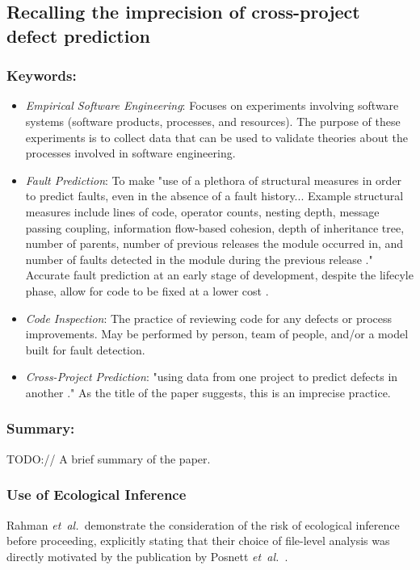 \documentclass{sig-alternate-05-2015}
\newcommand{\etal}{\mbox{\emph{et al.\ }}}
\begin{document}
\subsection{Recalling the imprecision of cross-project defect prediction \cite{Rahman:2012}}

\subsubsection{Keywords:}
\begin{itemize}
\item \emph{Empirical Software Engineering}: Focuses on experiments involving software systems (software products, processes, and resources). The purpose of these experiments is to collect data that can be used to validate theories about the processes involved in software engineering.
\item \emph{Fault Prediction}: To make "use of a plethora of structural measures in order to predict faults, even in the absence of a fault history... Example structural measures include lines of code, operator counts, nesting depth, message passing coupling, information flow-based cohesion, depth of inheritance tree, number of parents, number of previous releases the module occurred in, and number of faults detected in the module during the previous release \cite{Binkley:2007}." Accurate fault prediction at an early stage of development, despite the lifecyle phase, allow for code to be fixed at a lower cost \cite{Binkley:2007}.
\item \emph{Code Inspection}: The practice of reviewing code for any defects or process improvements. May be performed by person, team of people, and/or a model built for fault detection.
\item \emph{Cross-Project Prediction}: "using data from one project to predict defects in another \cite{Rahman:2012}." As the title of the paper suggests, this is an imprecise practice.
\end{itemize} 

\subsubsection{Summary:}
TODO:// A brief summary of the paper.

\subsubsection{Use of Ecological Inference}
Rahman \etal demonstrate the consideration of the risk of ecological inference before proceeding, explicitly stating that their choice of file-level analysis was directly motivated by the publication by Posnett \etal.
\end{document}
